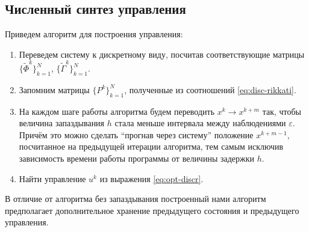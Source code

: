 \subsection{Численный синтез управления}

Приведем алгоритм для построения управления:
\begin{enumerate}
        \item Переведем систему к дискретному виду, посчитав соответствующие матрицы 
        $\{\tilde \Phi^k\}_{k=1}^{N}$, $\{\tilde \Gamma^k\}_{k=1}^{N}$.

        \item Запомним матрицы $\{P^k\}_{k=1}^N$, полученные из соотношений \eqref{eq:disc-rikkati}.

        \item На каждом шаге работы алгоритма будем переводить $x^k \longrightarrow x^{k+m}$ так, чтобы величина запаздывания $h$ стала меньше интервала между наблюдениями $\varepsilon$. Причём это можно сделать ``прогнав через систему'' положение $x^{k+m-1}$, посчитанное на предыдущей итерации алгоритма, тем самым исключив зависимость времени работы программы от величины задержки $h$.

        \item Найти управление $u^k$ из выражения \eqref{eq:opt-discr}.
\end{enumerate}
В отличие от алгоритма без запаздывания построенный нами алгоритм предполагает дополнительное хранение предыдущего состояния и предыдущего управления.